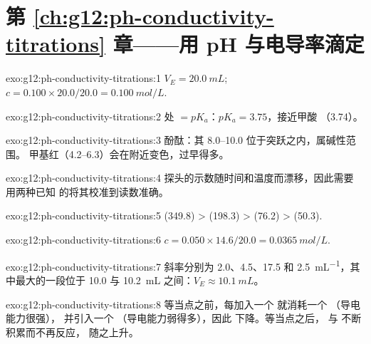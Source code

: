 \section*{第 \ref{ch:g12:ph-conductivity-titrations} 章——用 pH 与电导率滴定}

\begin{solution}{exo:g12:ph-conductivity-titrations:1}
$V_E = \qty{20.0}{mL}$; $c = 0.100 \times 20.0 / 20.0 = \qty{0.100}{mol/L}$.
\end{solution}

\begin{solution}{exo:g12:ph-conductivity-titrations:2}
处  $= pK_a$：$pK_a = 3.75$，接近甲酸
（3.74）。
\end{solution}

\begin{solution}{exo:g12:ph-conductivity-titrations:3}
酚酞：其 8.0--10.0 位于突跃之内，属碱性范围。
甲基红（4.2--6.3）会在附近变色，过早得多。
\end{solution}

\begin{solution}{exo:g12:ph-conductivity-titrations:4}
探头的示数随时间和温度而漂移，因此需要
用两种已知  的将其校准到读数准确。
\end{solution}

\begin{solution}{exo:g12:ph-conductivity-titrations:5}
 (349.8) >  (198.3) >  (76.2) >  (50.3).
\end{solution}

\begin{solution}{exo:g12:ph-conductivity-titrations:6}
$c = 0.050 \times 14.6 / 20.0 = \qty{0.0365}{mol/L}$.
\end{solution}

\begin{solution}{exo:g12:ph-conductivity-titrations:7}
斜率分别为 2.0、4.5、17.5 和 \qty{2.5}{mL^{-1}}，其中最大的一段位于
10.0 与 \qty{10.2}{mL} 之间：$V_E \approx \qty{10.1}{mL}$。
\end{solution}

\begin{solution}{exo:g12:ph-conductivity-titrations:8}
等当点之前，每加入一个  就消耗一个 （导电能力很强），
并引入一个 （导电能力弱得多），因此
下降。等当点之后， 与  不断积累而不再反应，
随之上升。
\end{solution}


